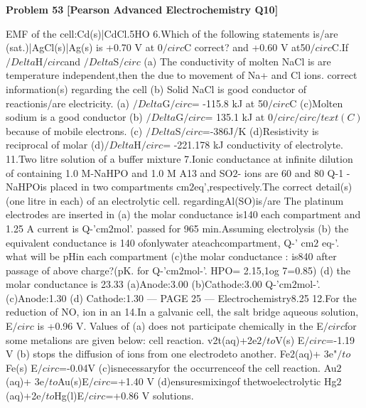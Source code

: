 \begin{problembox}
\textbf{Problem 53} \hfill \textbf{[Pearson Advanced Electrochemistry Q10]}
\label{q:ext-pearson-53}

EMF of the cell:Cd(s)|CdCl.5HO
6.Which of the following statements is/are
(sat.)|AgCl(s)|Ag(s) is +0.70 V at 0$/circ$C
correct?
and +0.60 V at50$/circ$C.If $/Delta$H$/circ$and $/Delta$S$/circ$
(a) The conductivity of molten NaCl is
are temperature independent,then the
due to movement of Na+ and Cl ions.
correct information(s) regarding the cell
(b) Solid NaCl is good conductor of
reactionis/are
electricity.
(a) $/Delta$G$/circ$= -115.8 kJ at 50$/circ$C
(c)Molten sodium is a good conductor
(b) $/Delta$G$/circ$= 135.1 kJ at 0$/circ$$/circ/text(C)$
because of mobile electrons.
(c) $/Delta$S$/circ$=-386J/K
(d)Resistivity is reciprocal of molar
(d)$/Delta$H$/circ$= -221.178 kJ
conductivity of electrolyte.
11.Two litre solution of a buffer mixture
7.Ionic conductance at infinite dilution of
containing 1.0 M-NaHPO and 1.0 M
A13 and SO$2$- ions are 60 and 80 Q-1
-NaHPOis placed in two compartments
cm$2$eq',respectively.The correct detail(s)
(one litre in each) of an electrolytic cell.
regardingAl(SO)is/are
The platinum electrodes are inserted in
(a) the molar conductance is140
each compartment and 1.25 A current is
Q-'cm$2$mol'.
passed for 965 min.Assuming electrolysis
(b) the equivalent conductance is 140
ofonlywater ateachcompartment,
Q-' cm$2$ eq-'.
what will be pHin each compartment
(c)the molar
conductance
: is840
after passage of above charge?(pK. for
Q-'cm$2$mol-'.
HPO= 2.15,1og 7=0.85)
(d) the molar conductance is 23.33
(a)Anode:3.00
(b)Cathode:3.00
Q-'cm$2$mol-'.
(c)Anode:1.30
(d) Cathode:1.30
--- PAGE 25 ---
Electrochemistry8.25
12.For the reduction of NO, ion in an
14.In a galvanic cell, the salt bridge
aqueous solution, E$/circ$ is +0.96 V. Values of
(a) does not participate chemically in the
E$/circ$for some metalions are given below:
cell reaction.
v2t(aq)+2e$2$$/to$V(s)
E$/circ$=-1.19 V
(b) stops the diffusion of ions from one
electrodeto another.
Fe$2$(aq)+ 3e"$/to$ Fe(s)
E$/circ$=-0.04V
(c)isnecessaryfor the occurrenceof the
cell reaction.
Au$2$(aq)+ 3e$/to$Au(s)E$/circ$=+1.40 V
(d)ensuresmixingof thetwoelectrolytic
Hg$2$(aq)+2e$/to$Hg(l)E$/circ$=+0.86 V
solutions.
\end{problembox}

